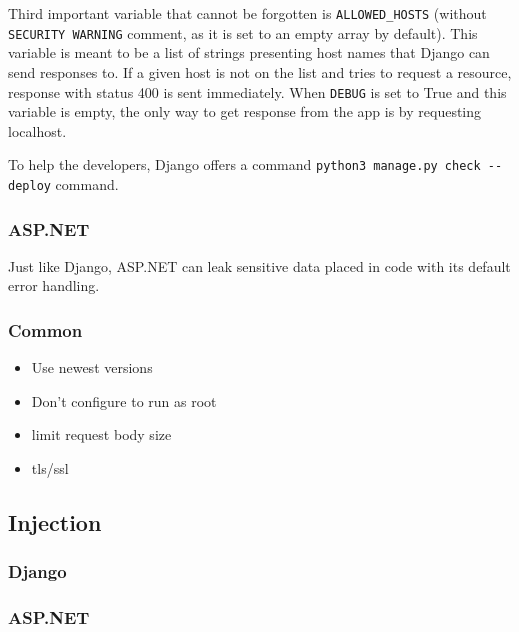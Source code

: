 Third important variable that cannot be forgotten is \lstinline{ALLOWED_HOSTS} (without \lstinline{SECURITY WARNING} comment, as it is set to an empty array by default). This variable is meant to be a list of strings presenting host names that Django can send responses to. If a given host is not on the list and tries to request a resource, response with status 400 is sent immediately. When \lstinline{DEBUG} is set to True and this variable is empty, the only way to get response from the app is by requesting localhost.

To help the developers, Django offers a command \lstinline{python3 manage.py check --deploy} command.

\subsubsection{ASP.NET}

Just like Django, ASP.NET can leak sensitive data placed in code with its default error handling.


\subsubsection{Common}
\begin{itemize}
    \item Use newest versions
    \item Don't configure to run as root
    \item limit request body size
    \item tls/ssl
\end{itemize}

\subsection{Injection}
\subsubsection{Django}
\subsubsection{ASP.NET}
